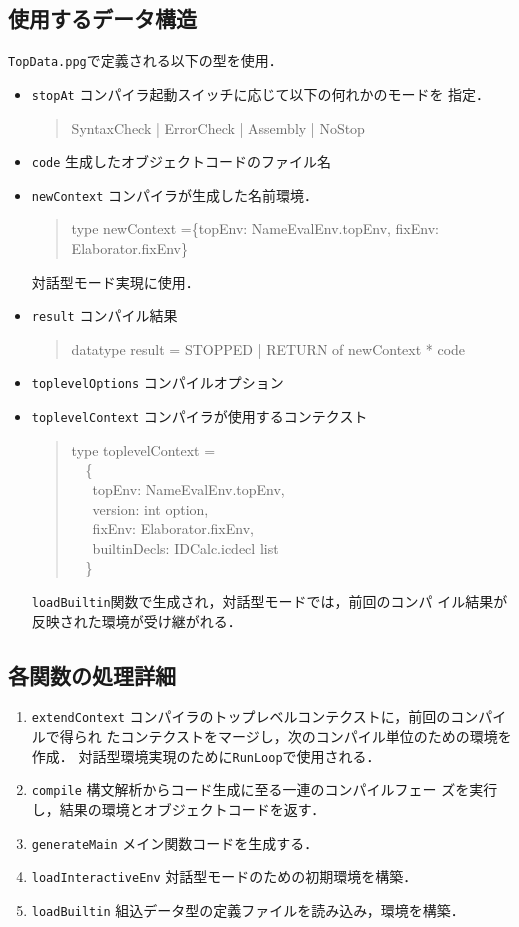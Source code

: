 \documentclass{jbook}
\newcommand{\code}[1]{\mbox{\large\tt #1}}
\newcommand{\myem}{\mbox{\ \ }}
\newenvironment{program}{\begin{quote}\begin{tt}}%
                        {\end{tt}\end{quote}}
\begin{document}
\subsection{使用するデータ構造}
\code{TopData.ppg}で定義される以下の型を使用．
\begin{itemize}
\item \code{stopAt} コンパイラ起動スイッチに応じて以下の何れかのモードを
指定．
\begin{program}
SyntaxCheck | ErrorCheck | Assembly | NoStop
\end{program}
\item \code{code} 生成したオブジェクトコードのファイル名
\item \code{newContext} コンパイラが生成した名前環境．
\begin{program}
type newContext =\{topEnv: NameEvalEnv.topEnv, fixEnv: Elaborator.fixEnv\}
\end{program}
対話型モード実現に使用．
\item \code{result} コンパイル結果
\begin{program}
datatype result = STOPPED | RETURN of newContext * code
\end{program}
\item \code{toplevelOptions} コンパイルオプション
\item \code{toplevelContext} コンパイラが使用するコンテクスト
\begin{program}
type toplevelContext =\\
\myem  \{\\
\myem\  topEnv: NameEvalEnv.topEnv,\\
\myem\  version: int option,\\
\myem\  fixEnv: Elaborator.fixEnv,\\
\myem\  builtinDecls: IDCalc.icdecl list\\
\myem  \}
\end{program}
	\code{loadBuiltin}関数で生成され，対話型モードでは，前回のコンパ
イル結果が反映された環境が受け継がれる．
\end{itemize}
\subsection{各関数の処理詳細}
\begin{enumerate}
\item \code{extendContext}
	コンパイラのトップレベルコンテクストに，前回のコンパイルで得られ
たコンテクストをマージし，次のコンパイル単位のための環境を作成．
	対話型環境実現のために\code{RunLoop}で使用される．
\item \code{compile} 構文解析からコード生成に至る一連のコンパイルフェー
ズを実行し，結果の環境とオブジェクトコードを返す．
\item \code{generateMain}
	メイン関数コードを生成する．
\item \code{loadInteractiveEnv}
	対話型モードのための初期環境を構築．
\item \code{loadBuiltin}
	組込データ型の定義ファイルを読み込み，環境を構築．
\end{enumerate}
\end{document}
